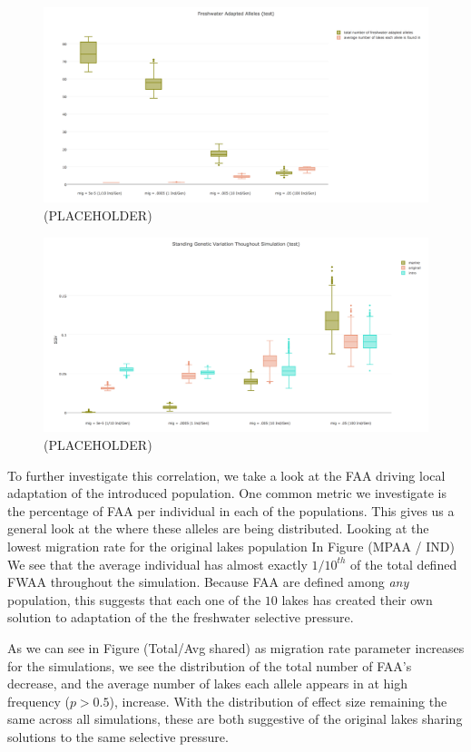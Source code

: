 \documentclass{article}
\begin{document}
\begin{figure}
	\begin{center}
  		\includegraphics[width=0.6\linewidth]{plotlyPlots/NumFAA.png}
  		\caption{(PLACEHOLDER)}
		\label{fig:NumFAA}
	\end{center}
\end{figure}

\begin{figure}
	\begin{center}
  		\includegraphics[width=0.6\linewidth]{plotlyPlots/StandingGeneticVariation.png}
  		\caption{(PLACEHOLDER)}
		\label{fig:NumFAA}
	\end{center}
\end{figure}



To further investigate this correlation, we take a look at the FAA driving 
local adaptation of the introduced population. 
One common metric we investigate is the percentage of FAA per individual in each of the populations. 
This gives us a general look at the where these alleles are being distributed. 
Looking at the lowest migration rate for the original lakes population In Figure (MPAA / IND) 
We see that the average individual has almost exactly $1/10^{th}$ of the total defined FWAA throughout the simulation. 
Because FAA are defined among \textit{any} population, this suggests that each one of the $10$ 
lakes has created their own solution to adaptation of the the freshwater selective pressure. 

As we can see in Figure (Total/Avg shared)
as migration rate parameter increases for the simulations, 
we see the distribution of the total number of FAA's decrease, and 
the average number of lakes each allele appears in at high frequency ($p > 0.5$), increase.
With the distribution of effect size remaining the same across all simulations, 
these are both suggestive of the original lakes sharing solutions to the same selective pressure.
\end{document}
